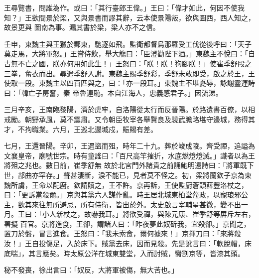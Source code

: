 \begin{pinyinscope}
 王尋覽書，問誰為作。或曰：「其行臺郎王偉。」王曰：「偉才如此，何因不使我知？」王欲間景於梁，又與景書而謬其辭，云本使景陽叛，欲與圖西，西人知之，故景更與
 圖南為事。漏其書於梁，梁人亦不之信。



 壬申，東魏主與王獵於鄴東，馳逐如飛。監衛都督烏那羅受工伐從後呼曰：「天子莫走馬，大將軍怒。」王嘗侍飲，舉大觴曰：「臣澄勸陛下酒。」東魏主不悅曰：「自古無不亡之國，朕亦何用如此生！」王怒曰：「朕！朕！狗腳朕！」使崔季舒毆之三拳，奮衣而出。尋遣季舒入謝。東魏主賜季舒彩，季舒未敢即受，啟之於王，王使取一段。東魏主以四百匹與之，曰：「亦一段耳。」東魏主不堪憂辱，詠謝靈運詩曰：「韓亡子房奮，秦
 帝魯連恥。本自江海人，忠義感君子。」因流涕。



 三月辛亥，王南臨黎陽，濟於虎牢，自洛陽從太行而反晉陽。於路遺書百僚，以相戒勵。朝野承風，莫不震肅。又令朝臣牧宰各舉賢良及驍武膽略堪守邊城，務得其才，不拘職業。六月，王巡北邊城戍，賑賜有差。



 七月，王還晉陽。辛卯，王遇盜而殂，時年二十九。葬於峻成陵。齊受禪，追謚為文襄皇帝，廟號世宗。時有童謠曰：「百尺高竿摧折，水底燃燈燈滅。」識者以為王將殂之兆也。數日前，崔季舒無
 故於北宮門外諸貴之前誦鮑明遠詩曰：「將軍既下世，部曲亦罕存。」聲甚淒斷，淚不能已，見者莫不怪之。初，梁將蘭欽子京為東魏所虜，王命以配廚。欽請贖之，王不許。京再訴，王使監廚蒼頭薛豐洛杖之，曰：「更訴當殺爾。」京與其黨六人謀作亂。時王居北城東柏堂蒞政，以寵琅邪公主，欲其來往無所避忌，所有侍衛，皆出於外。太史啟言宰輔星甚微，變不出一月。王曰：「小人新杖之，故嚇我耳。」將欲受禪，與陳元康、崔季舒等屏斥左右，署擬
 百官。京將進食，王卻，謂諸人曰：「昨夜夢此奴斫我，宜殺卻。」京聞之，置刀於盤，冒言進食。王怒曰：「我未索食，爾何據來！」京揮刀曰：「來將殺汝！」王自投傷足，入於床下。賊黨去床，因而見殺。先是訛言曰：「軟脫帽，床底喘」，其言應矣。時太原公洋在城東雙堂，入而討賊，臠割京等，皆漆其頭。



 秘不發喪，徐出言曰：「奴反，大將軍被傷，無大苦也。」



\end{pinyinscope}